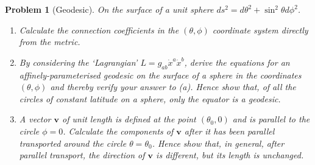 \documentclass[a4paper]{article}
\theoremstyle{new}
\newtheorem{qns}{Problem}[section]
\begin{document}
\begin{qns}[Geodesic]
On the surface of a unit sphere $ds^2 = d\theta^2 + \sin^2\theta d\phi^2$.
\begin{enumerate}[label=(\alph*)]
\item  Calculate the connection coefficients in the $(\theta,\phi)$ coordinate system directly from the metric.
\item By considering the ‘Lagrangian’ $L=g_{ab}\dot{x}^a\dot{x}^b$, derive the equations for an affinely-parameterised geodesic on the surface of a sphere in the coordinates $(\theta, \phi)$ and thereby verify your answer to (a). Hence show that, of all the circles of constant latitude on a sphere, only the equator is a geodesic.
\item A vector $\mathbf{v}$ of unit length is defined at the point $(\theta_0,0)$ and is parallel to the circle $\phi = 0$. Calculate the components of $\mathbf{v}$ after it has been parallel transported around the circle $\theta=\theta_0$. Hence show that, in general, after parallel transport, the direction of $\mathbf{v}$ is different, but its length is unchanged.
\end{enumerate}
\end{qns}
\end{document}
